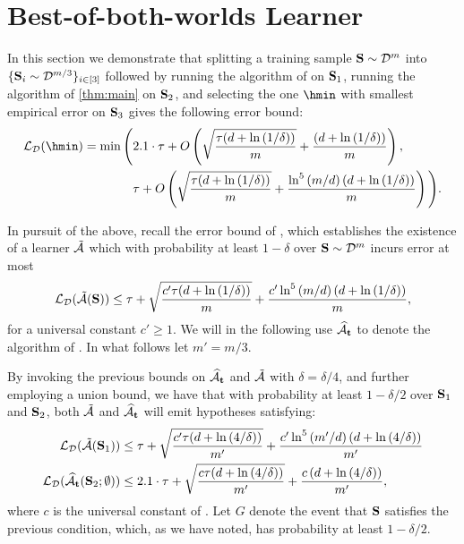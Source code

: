 \section{Best-of-both-worlds Learner}


In this section we demonstrate that splitting a  training sample $ \mathbf{S} \sim \mathcal{D}^{m} $ into $\{ \mathbf{S}_i \sim \mathcal{D}^{m/3}\}_{i \in [3]}$ followed by running the algorithm of \citet{hanneke2024revisiting} on $ \mathbf{S}_{1} $, running the algorithm of \cref{thm:main} on $ \mathbf{S}_{2} $, and selecting the one $\hmin$ with smallest empirical error on $ \mathbf{S}_{3} $  gives the following error bound:
\begin{align*}
\ls_{\cD}(\hmin) = \min\Bigg(&2.1 \cdot \tau+O\left(\sqrt{\frac{\tau(d+\ln{\left(1/\delta \right)})}{m}}+\frac{\left(d+\ln{\left(1/\delta \right)}\right)}{m}\right), \\
&\tau+O\left(\sqrt{\frac{\tau(d+\ln{\left(1/\delta \right)})}{m}}+\frac{\ln^{5}{\left( m/d\right)}\left(d+\ln{\left(1/\delta \right)}      \right)}{m} \right)\Bigg).
\end{align*}

In pursuit of the above, recall the error bound of \cite[Theorem~3]{hanneke2024revisiting}, which establishes the existence of a learner $ \tilde{\mathcal{A}} $ which with probability at least $ 1-\delta  $ over $ \mathbf{S} \sim \mathcal{D}^m$ incurs error at most
\begin{align*}
    \operatorname{\mathcal{L}}_{\mathcal{D}}(\tilde{\mathcal{A}}(\mathbf{S}))\leq \tau+\sqrt{\frac{c'\tau(d+\ln{\left(1/\delta \right)})}{m}}+\frac{c'\ln^{5}{\left( m/d\right)}\left(d+\ln{\left(1/\delta \right)}      \right)}{m},
\end{align*}
for a universal constant $c' \geq 1$. 
We will in the following use $ \widehat{\mathcal{A}}_{\mathbf{t}} $ to denote the algorithm of . In what follows let $m'=m/3.$

By invoking the previous bounds on  $ \widehat{\mathcal{A}}_{\mathbf{t}} $ and $ \tilde{\mathcal{A}} $ with $\delta = \delta/4$, and further employing a union bound, we have that with probability at least $1 - \delta/2$ over $\mathbf{S}_1$ and $\mathbf{S}_2$, both $\tilde{\mathcal{A}}$ and $\widehat{\mathcal{A}}_{\mathbf{t}}$ will emit hypotheses satisfying: 
\begin{align}\label{eq:bestofbothworld0}
 \operatorname{\mathcal{L}}_{\mathcal{D}}(\tilde{\mathcal{A}}(\mathbf{S}_{1})) &\leq \tau+\sqrt{\frac{c'\tau(d+\ln{\left(4/\delta \right)})}{m'}}+\frac{c'\ln^{5}{\left( m'/d\right)}\left(d+\ln{\left(4/\delta \right)}      \right)}{m'} \\
 \operatorname{\mathcal{L}}_{\mathcal{D}}(\widehat{\mathcal{A}}_{\mathbf{t}}(\mathbf{S}_{2};\emptyset)) &\leq 2.1 \cdot \tau+\sqrt{\frac{c\tau(d+\ln{\left(4/\delta \right)})}{m'}}+\frac{c\left(d+\ln{\left(4/\delta \right)}\right)}{m'}, \label{eq:bestofbothworld0.5}
\end{align}
where $c$ is the universal constant of . Let $G$ denote the event that $\mathbf{S}$ satisfies the previous condition, which, as we have noted, has probability at least $1 - \delta / 2$. 

